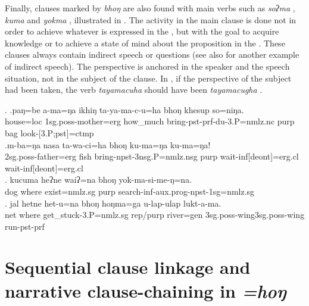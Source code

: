 	
Finally, clauses marked by \emph{bhoŋ} are also found with main verbs such as \emph{soʔma} , \emph{kuma}  and \emph{yokma} , illustrated in \Next. The activity in the main clause is done not in order to achieve whatever is expressed in the , but with the goal to acquire knowledge or to achieve a state of mind about the proposition in the .  These clauses always contain indirect speech or questions (see also \LLast[c] for another example of indirect speech). The perspective is anchored in the speaker and the speech situation, not in the subject of the clause. In \Next[a], if the perspective of the subject had been taken, the verb \emph{tayamacuha} should have been \emph{tayamacugha}  .

	\ex. \ag.paŋ=be     a-ma=ŋa       ikhiŋ   ta-ya-ma-c-u=ha     bhoŋ khesup so=niŋa.\\
	house{\sc =loc} {\sc 1sg.poss-}mother{\sc =erg} how\_much bring{\sc -pst-prf-du-3.P=nmlz.nc} {\sc purp} bag look{\sc -[3.P;pst]=ctmp}\\
	 
	\bg.m-ba=ŋa                nasa ta-wa-ci=ha                      bhoŋ ku-ma=ŋa                  ku-ma=ŋa!\\
{\sc 2sg.poss-}father{\sc =erg} fish bring{\sc -npst-3nsg.P=nmlz.nsg} {\sc purp}  wait{\sc -inf[deont]=erg.cl} wait{\sc -inf[deont]=erg.cl}\\
 
	\bg. kucuma heʔne waiʔ=na bhoŋ yok-ma-si-me-ŋ=na.\\
	dog where exist{\sc [npst;3sg]=nmlz.sg} {\sc purp} search{\sc -inf-aux.prog-npst-1sg=nmlz.sg}\\
\bg. jal hetne het-u=na bhoŋ hoŋma=ga u-lap-ulap lukt-a-ma.\\
net where get\_stuck{\sc -3.P=nmlz.sg} {\sc rep/purp} river{\sc =gen} {\sc 3sg.poss}-wing{\sc 3sg.poss}-wing run{\sc [3sg]-pst-prf}\\
  



\section{Sequential clause linkage and narrative clause-chaining in \emph{=hoŋ}}\label{adv-cl-seq}

